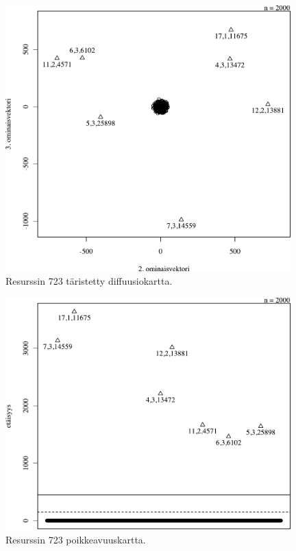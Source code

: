 \begin{figure}[p]
\centering
\includegraphics[width=11cm]{pics/diffuusiokuvat/service_723.pdf}
\caption{Resurssin 723 täristetty diffuusiokartta.}
\label{diffuusio_723}
\end{figure}

\begin{figure}[p]
\centering
\includegraphics[width=11cm]{pics/tiheyskuvat/service_723.pdf}
\caption{Resurssin 723 poikkeavuuskartta.}
\label{service_723}
\end{figure}

